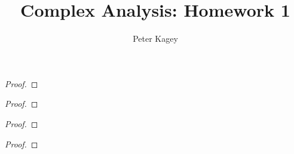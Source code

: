 \documentclass{article}
\newenvironment{problem}[2][Problem]{\begin{trivlist}
\item[\hskip \labelsep {\bfseries #1}\hskip \labelsep {\bfseries #2.}]}{\end{trivlist}}
\begin{document}
\title{Complex Analysis: Homework 1}
\author{Peter Kagey}

\maketitle

\begin{problem}{1}
\end{problem}

\begin{proof}
\end{proof}

\pagebreak

\begin{problem}{2}
\end{problem}

\begin{proof}
\end{proof}

\pagebreak

\begin{problem}{3}
\end{problem}

\begin{proof}
\end{proof}

\pagebreak

\begin{problem}{4}
\end{problem}

\begin{proof}
\end{proof}
\end{document}
